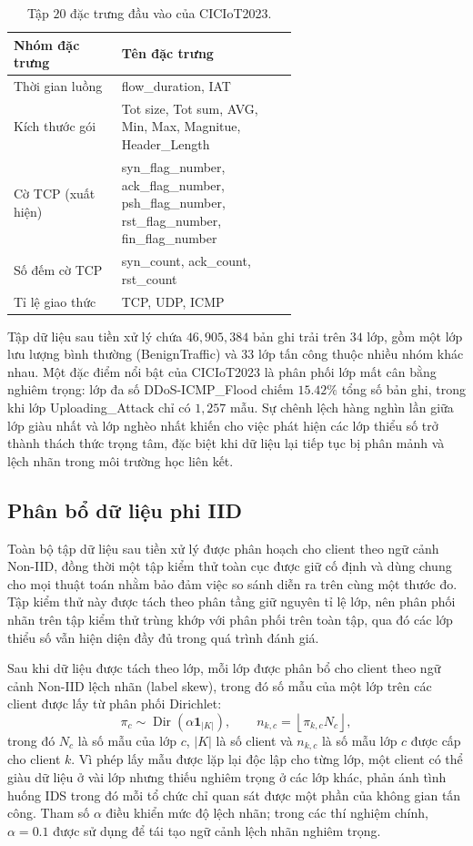 \begin{table}[H]
\centering
\caption{Tập $20$ đặc trưng đầu vào của CICIoT2023.}
\label{tab:cic23_features}
\begin{tabular}{lp{0.62\linewidth}}
\hline
Nhóm đặc trưng & Tên đặc trưng \\
\hline
Thời gian luồng       & flow\_duration, IAT \\
Kích thước gói        & Tot size, Tot sum, AVG, Min, Max, Magnitue, Header\_Length \\
Cờ TCP (xuất hiện)    & syn\_flag\_number, ack\_flag\_number, psh\_flag\_number, rst\_flag\_number, fin\_flag\_number \\
Số đếm cờ TCP         & syn\_count, ack\_count, rst\_count \\
Tỉ lệ giao thức       & TCP, UDP, ICMP \\
\hline
\end{tabular}
\end{table}

Tập dữ liệu sau tiền xử lý chứa $46{,}905{,}384$ bản ghi trải trên $34$ lớp, gồm một lớp lưu lượng bình thường (BenignTraffic) và $33$ lớp tấn công thuộc nhiều nhóm khác nhau. Một đặc điểm nổi bật của CICIoT2023 là phân phối lớp mất cân bằng nghiêm trọng: lớp đa số DDoS-ICMP\_Flood chiếm $15.42\%$ tổng số bản ghi, trong khi lớp Uploading\_Attack chỉ có $1{,}257$ mẫu. Sự chênh lệch hàng nghìn lần giữa lớp giàu nhất và lớp nghèo nhất khiến cho việc phát hiện các lớp thiểu số trở thành thách thức trọng tâm, đặc biệt khi dữ liệu lại tiếp tục bị phân mảnh và lệch nhãn trong môi trường học liên kết.

\subsection{Phân bổ dữ liệu phi IID}
Toàn bộ tập dữ liệu sau tiền xử lý được phân hoạch cho client theo ngữ cảnh Non-IID, đồng thời một tập kiểm thử toàn cục được giữ cố định và dùng chung cho mọi thuật toán nhằm bảo đảm việc so sánh diễn ra trên cùng một thước đo. Tập kiểm thử này được tách theo phân tầng giữ nguyên tỉ lệ lớp, nên phân phối nhãn trên tập kiểm thử trùng khớp với phân phối trên toàn tập, qua đó các lớp thiểu số vẫn hiện diện đầy đủ trong quá trình đánh giá.

Sau khi dữ liệu được tách theo lớp, mỗi lớp được phân bổ cho client theo ngữ cảnh Non-IID lệch nhãn (label skew), trong đó số mẫu của một lớp trên các client được lấy từ phân phối Dirichlet:
\[
\pi_c\sim \operatorname{Dir}(\alpha\mathbf{1}_{|K|}),
\qquad
n_{k,c}=\left\lfloor \pi_{k,c}N_c\right\rfloor,
\]
trong đó $N_c$ là số mẫu của lớp $c$, $|K|$ là số client và $n_{k,c}$ là số mẫu lớp $c$ được cấp cho client $k$. Vì phép lấy mẫu được lặp lại độc lập cho từng lớp, một client có thể giàu dữ liệu ở vài lớp nhưng thiếu nghiêm trọng ở các lớp khác, phản ánh tình huống IDS trong đó mỗi tổ chức chỉ quan sát được một phần của không gian tấn công. Tham số $\alpha$ điều khiển mức độ lệch nhãn; trong các thí nghiệm chính, $\alpha=0.1$ được sử dụng để tái tạo ngữ cảnh lệch nhãn nghiêm trọng.

